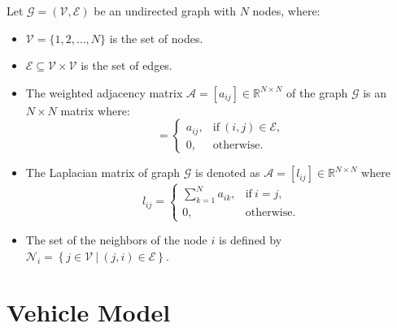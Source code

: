 \documentclass[letterpaper, 10pt, conference]{ieeeconf}  %
\def\V{\mathcal{V}} %
\def\E{\mathcal{E}} %
\def\G{\mathcal{G}} %
\def\A{\mathcal{A}} %
\def\N{\mathcal{N}} %
\begin{document}
Let $\G = (\V, \E)$ be an undirected graph with $N$ nodes, where:
\begin{itemize}
    \item $\V = \{1, 2, \dots, N\}$ is the set of nodes.
    \item $\E \subseteq \V \times \V$ is the set of edges.
    \item The weighted adjacency matrix $\A = [a_{ij}] \in \mathbb{R}^{N \times N}$ of the graph $\G$ is an $N \times N$ matrix where:
    \begin{equation}
        [a_{ij}] = \begin{cases}
            a_{ij}, & \text{if}\ (i,j) \in \E , \\
            0, & \text{otherwise}.
        \end{cases}
    \end{equation}
    \item The Laplacian matrix of graph $\G$ is denoted as $\A = [l_{ij}] \in \mathbb{R}^{N \times N}$ where
    \begin{equation}
        l_{ij} = \begin{cases}
            \sum_{k=1}^{N}a_{ik}, & \text{if}\  i = j , \\
            0, & \text{otherwise}.
        \end{cases}
    \end{equation}
    \item The set of the neighbors of the node $i$ is defined by $\N_{i} =  \left\{j \in \V \ | \ \left( j, i \right) \in \E \right\}$.
\end{itemize}




\section{Vehicle Model}\label{sec_vehiclemodel}
\end{document}
